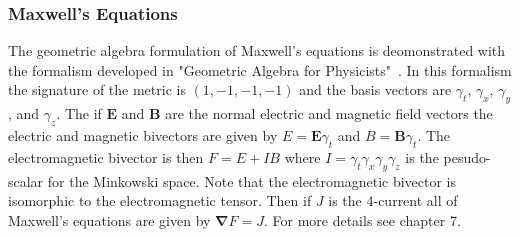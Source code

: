 \documentclass[10pt]{article}
\begin{document}
\subsubsection{Maxwell's Equations}

The geometric algebra formulation of Maxwell's equations is deomonstrated
with the formalism developed in "Geometric Algebra for Physicists"~\cite{Doran}.
In this formalism the signature of the metric is $(1,-1,-1,-1)$ and the
basis vectors are $\gamma_{t}$, $\gamma_{x}$, $\gamma_{y}$,
and $\gamma_{z}$.  The if $\bm{E}$ and $\bm{B}$ are the
normal electric and magnetic field vectors the electric and magnetic
bivectors are given by $E = \bm{E}\gamma_{t}$ and $B = \bm{B}\gamma_{t}$.
The electromagnetic bivector is then $F = E+IB$ where
$I = \gamma_{t}\gamma_{x}\gamma_{y}\gamma_{z}$ is the pesudo-scalar
for the Minkowski space.  Note that the electromagnetic bivector is isomorphic
to the electromagnetic tensor.  Then if $J$ is the 4-current all of
Maxwell's equations are given by $\bm{\nabla}F = J$.  For more details
see \cite{Doran} chapter 7.
\end{document}

